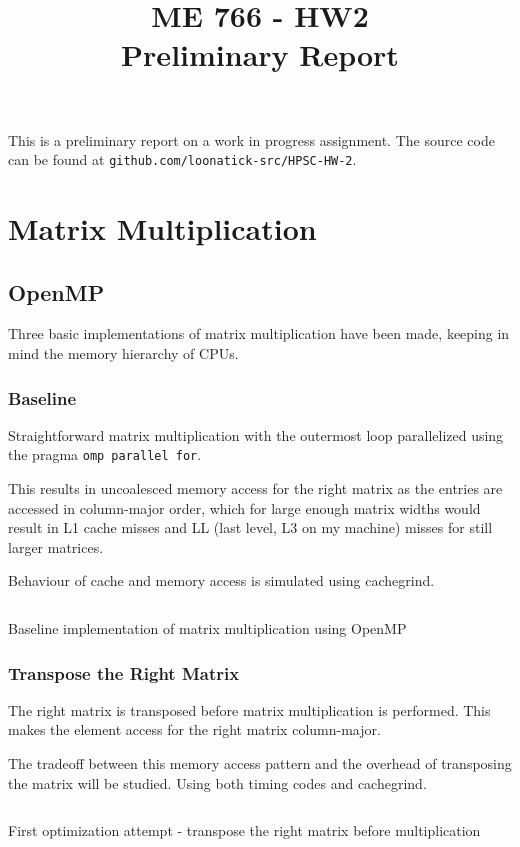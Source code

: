 \documentclass[a4paper]{article}
\title{ME 766 - HW2\\Preliminary Report}
\date{}
\newenvironment{code}{\captionsetup{type=listing}}{}
\begin{document}
\maketitle{}
This is a preliminary report on a work in progress assignment.  
The source code can be found at \texttt{github.com/loonatick-src/HPSC-HW-2}.

\section*{Matrix Multiplication}
\subsection*{OpenMP}
Three basic implementations of matrix multiplication have been
made, keeping in mind the memory hierarchy of CPUs.

\subsubsection*{Baseline}
Straightforward matrix multiplication with the outermost loop
parallelized using the pragma \texttt{omp parallel for}. 

This results in uncoalesced memory access for the right matrix
as the entries are accessed in column-major order, which for
large enough matrix widths would result in L1 cache misses and
LL (last level, L3 on my machine) misses for still larger
matrices.

Behaviour of cache and memory access is simulated using cachegrind. 
 
\begin{code}
\inputminted[samepage=false, breaklines, firstline=21, lastline=53]{c}{../src/impl_omp.c}
\label{lst:matmul_omp_baseline}
\caption{Baseline implementation of matrix multiplication using OpenMP}
\end{code}
\subsubsection*{Transpose the Right Matrix}
The right matrix is transposed before matrix multiplication is
performed. This makes the element access for the right matrix
column-major.

The tradeoff between this memory access pattern and the
overhead of transposing the matrix will be studied. Using
both timing codes and cachegrind.

\begin{code}
\inputminted[samepage=false, breaklines, firstline=56, lastline=111]{c}{../src/impl_omp.c}
\label{lst:matmul_omp_transpose}
\caption{First optimization attempt - transpose the right matrix before multiplication}
\end{code}
\end{document}
